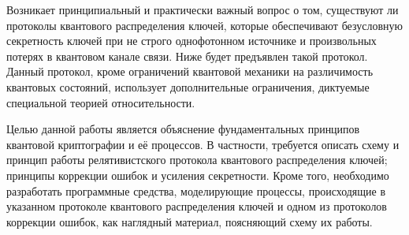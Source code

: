 Возникает принципиальный и практически важный вопрос о том, существуют ли протоколы квантового распределения ключей, которые обеспечивают безусловную секретность ключей при не строго 
однофотонном источнике и произвольных потерях в квантовом канале связи. Ниже будет предъявлен такой протокол. Данный протокол, кроме ограничений квантовой механики на различимость квантовых состояний, использует дополнительные ограничения, диктуемые специальной теорией относительности.

Целью данной работы является объяснение фундаментальных принципов квантовой криптографии и её процессов. 
В частности, требуется описать схему и принцип работы релятивистского протокола квантового распределения ключей; принципы коррекции ошибок и усиления секретности.
Кроме того, необходимо разработать программные средства, моделирующие процессы, происходящие в указанном протоколе квантового распределения ключей и одном из протоколов коррекции ошибок, как наглядный материал, поясняющий схему их работы.


\clearpage